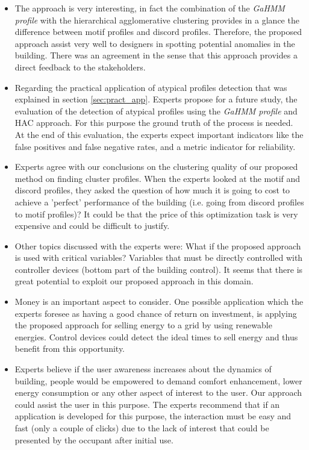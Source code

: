 \begin{itemize}
\item The approach is very interesting, in fact the combination of the \textit{GaHMM profile} with the hierarchical agglomerative clustering provides in a glance the difference between motif profiles and discord profiles. Therefore, the proposed approach assist very well to designers in spotting potential anomalies in the building. There was an agreement in the sense that this approach provides a direct feedback to the stakeholders. 

\item Regarding the practical application of atypical profiles detection that was explained in section \ref{sec:pract_app}. Experts propose for a future study, the evaluation of the detection of atypical profiles using the \textit{GaHMM profile} and HAC approach. For this purpose the ground truth of the process is needed. At the end of this evaluation, the experts expect important indicators like the false positives and false negative rates, and a metric indicator for reliability. 

  
\item Experts agree with our conclusions on the clustering quality of our proposed method on finding cluster profiles. 
When the experts looked at the motif and discord profiles, they asked the question of how much it is going to cost to achieve a 'perfect' performance of the building (i.e. going from discord profiles to motif profiles)? It could be that the price of this optimization task is very expensive and could be difficult to justify. 


\item Other topics discussed with the experts were: What if the proposed approach is used with critical variables? Variables that must be directly controlled with controller devices (bottom part of the building control). It seems that there is great potential to exploit our proposed approach in this domain.
      
\item Money is an important aspect to consider. One possible application which the experts foresee as having a good chance of return on investment, is applying the proposed approach for selling energy to a grid by using renewable energies. Control devices could detect the ideal times to sell energy and thus benefit from this opportunity.   
   

\item Experts believe if the user awareness increases about the dynamics of building, people would be empowered to demand comfort enhancement, lower energy consumption or any other aspect of interest to the user. Our approach could assist the user in this purpose. The experts recommend that if an application is developed for this purpose, the interaction must be easy and fast (only a couple of clicks) due to the lack of interest that could be presented by the occupant after initial use.



\end{itemize}
